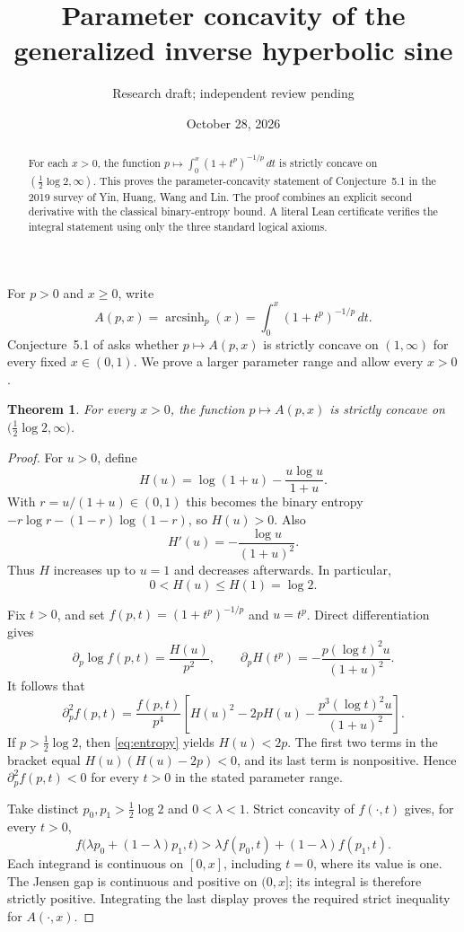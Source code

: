 \documentclass[11pt]{article}
\title{Parameter concavity of the generalized inverse hyperbolic sine}
\author{Research draft; independent review pending}
\date{October 28, 2026}
\newtheorem{theorem}{Theorem}
\begin{document}
\maketitle
\begin{abstract}
For each $x>0$, the function
$p\mapsto\int_0^x(1+t^p)^{-1/p}\,dt$ is strictly concave on
$(\tfrac12\log 2,\infty)$. This proves the parameter-concavity statement
of Conjecture~5.1 in the 2019 survey of Yin, Huang, Wang and Lin.
The proof combines an explicit second derivative with the classical
binary-entropy bound. A literal Lean certificate verifies the integral
statement using only the three standard logical axioms.
\end{abstract}

For $p>0$ and $x\geq0$, write
\begin{equation}\label{eq:def}
 A(p,x)=\operatorname{arcsinh}_p(x)
       =\int_0^x(1+t^p)^{-1/p}\,dt.
\end{equation}
Conjecture~5.1 of \cite{YHWL} asks whether $p\mapsto A(p,x)$ is strictly
concave on $(1,\infty)$ for every fixed $x\in(0,1)$. We prove a larger
parameter range and allow every $x>0$.

\begin{theorem}\label{thm:main}
For every $x>0$, the function $p\mapsto A(p,x)$ is strictly concave on
$\bigl(\tfrac12\log 2,\infty\bigr)$.
\end{theorem}

\begin{proof}
For $u>0$, define
\[
 H(u)=\log(1+u)-\frac{u\log u}{1+u}.
\]
With $r=u/(1+u)\in(0,1)$ this becomes the binary entropy
$-r\log r-(1-r)\log(1-r)$, so $H(u)>0$. Also
\[
 H'(u)=-\frac{\log u}{(1+u)^2}.
\]
Thus $H$ increases up to $u=1$ and decreases afterwards. In particular,
\begin{equation}\label{eq:entropy}
 0<H(u)\leq H(1)=\log 2.
\end{equation}

Fix $t>0$, and set $f(p,t)=(1+t^p)^{-1/p}$ and $u=t^p$.
Direct differentiation gives
\[
 \partial_p\log f(p,t)=\frac{H(u)}{p^2},\qquad
 \partial_p H(t^p)=-\frac{p(\log t)^2u}{(1+u)^2}.
\]
It follows that
\begin{equation}\label{eq:deriv}
 \partial_p^2 f(p,t)=\frac{f(p,t)}{p^4}
 \left[H(u)^2-2pH(u)-\frac{p^3(\log t)^2u}{(1+u)^2}\right].
\end{equation}
If $p>\tfrac12\log2$, then \eqref{eq:entropy} yields
$H(u)<2p$. The first two terms in the bracket equal
$H(u)(H(u)-2p)<0$, and its last term is nonpositive. Hence
$\partial_p^2 f(p,t)<0$ for every $t>0$ in the stated parameter range.

Take distinct $p_0,p_1>\tfrac12\log2$ and $0<\lambda<1$.
Strict concavity of $f(\cdot,t)$ gives, for every $t>0$,
\[
 f\bigl(\lambda p_0+(1-\lambda)p_1,t\bigr)
 >\lambda f(p_0,t)+(1-\lambda)f(p_1,t).
\]
Each integrand is continuous on $[0,x]$, including $t=0$, where its
value is one. The Jensen gap is continuous and positive on $(0,x]$;
its integral is therefore strictly positive. Integrating the last display
proves the required strict inequality for $A(\cdot,x)$.
\end{proof}
\end{document}

